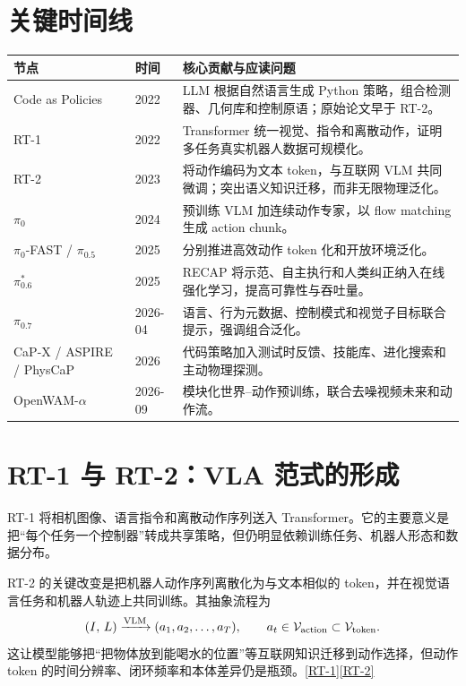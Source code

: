 \documentclass[UTF8,a4paper,11pt]{ctexart}
\begin{document}
\section{关键时间线}
\begin{longtable}{p{2.4cm}p{2.1cm}p{8.7cm}}
\toprule
节点 & 时间 & 核心贡献与应读问题\\
\midrule
Code as Policies & 2022 & LLM 根据自然语言生成 Python 策略，组合检测器、几何库和控制原语；原始论文早于 RT-2。\\
RT-1 & 2022 & Transformer 统一视觉、指令和离散动作，证明多任务真实机器人数据可规模化。\\
RT-2 & 2023 & 将动作编码为文本 token，与互联网 VLM 共同微调；突出语义知识迁移，而非无限物理泛化。\\
$\pi_0$ & 2024 & 预训练 VLM 加连续动作专家，以 flow matching 生成 action chunk。\\
$\pi_{0}$-FAST / $\pi_{0.5}$ & 2025 & 分别推进高效动作 token 化和开放环境泛化。\\
$\pi^*_{0.6}$ & 2025 & RECAP 将示范、自主执行和人类纠正纳入在线强化学习，提高可靠性与吞吐量。\\
$\pi_{0.7}$ & 2026-04 & 语言、行为元数据、控制模式和视觉子目标联合提示，强调组合泛化。\\
CaP-X / ASPIRE / PhysCaP & 2026 & 代码策略加入测试时反馈、技能库、进化搜索和主动物理探测。\\
OpenWAM-$\alpha$ & 2026-09 & 模块化世界--动作预训练，联合去噪视频未来和动作流。\\
\bottomrule
\end{longtable}

\section{RT-1 与 RT-2：VLA 范式的形成}
RT-1 将相机图像、语言指令和离散动作序列送入 Transformer。它的主要意义是把“每个任务一个控制器”转成共享策略，但仍明显依赖训练任务、机器人形态和数据分布。

RT-2 的关键改变是把机器人动作序列离散化为与文本相似的 token，并在视觉语言任务和机器人轨迹上共同训练。其抽象流程为
\[
 (I,\,L)\xrightarrow{\text{VLM}}(a_1,a_2,\ldots,a_T),\qquad a_t\in\mathcal{V}_{\rm action}\subset\mathcal{V}_{\rm token}.
\]
这让模型能够把“把物体放到能喝水的位置”等互联网知识迁移到动作选择，但动作 token 的时间分辨率、闭环频率和本体差异仍是瓶颈。\href{https://arxiv.org/abs/2212.06817}{[RT-1]}\;\href{https://arxiv.org/abs/2307.15818}{[RT-2]}
\end{document}
